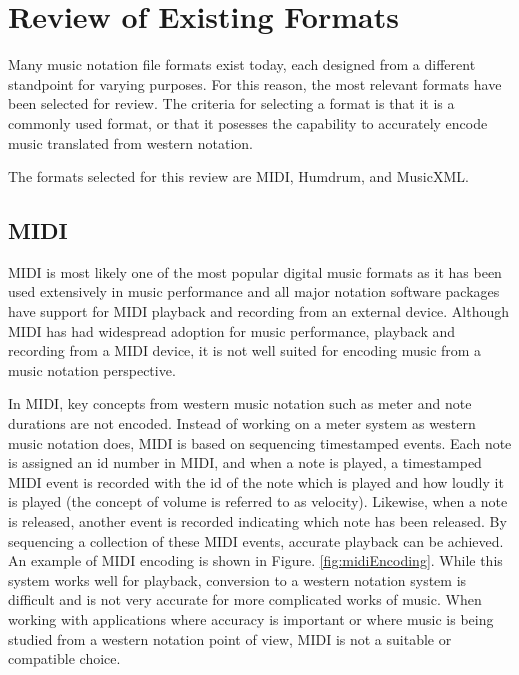 
\section{Review of Existing Formats}

Many music notation file formats exist today, each designed from a different standpoint for varying purposes. For this reason, the most relevant formats have been selected for review. The criteria for selecting a format is that it is a commonly used format, or that it posesses the capability to accurately encode music translated from western notation.

The formats selected for this review are MIDI, Humdrum, and MusicXML.

\subsection{MIDI}

MIDI \citep*{HeSe97} is most likely one of the most popular digital music formats as it has been used extensively in music performance and all major notation software packages have support for MIDI playback and recording from an external device. Although MIDI has had widespread adoption for music performance, playback and recording from a MIDI device, it is not well suited for encoding music from a music notation perspective.

In MIDI, key concepts from western music notation such as meter and note durations are not encoded. Instead of working on a meter system as western music notation does, MIDI is based on sequencing timestamped events. Each note is assigned an id number in MIDI, and when a note is played, a timestamped MIDI event is recorded with the id of the note which is played and how loudly it is played (the concept of volume is referred to as velocity). Likewise, when a note is released, another event is recorded indicating which note has been released. By sequencing a collection of these MIDI events, accurate playback can be achieved. An example of MIDI encoding is shown in Figure. \ref{fig:midiEncoding}. While this system works well for playback, conversion to a western notation system is difficult and is not very accurate for more complicated works of music. When working with applications where accuracy is important or where music is being studied from a western notation point of view, MIDI is not a suitable or compatible choice.


